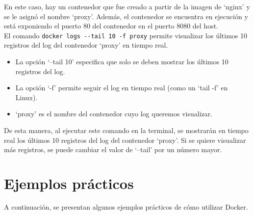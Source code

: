 \documentclass{article}
\begin{document}
En este caso, hay un contenedor que fue creado a partir de la imagen de \enquote*{nginx} y se le asignó el nombre \enquote*{proxy}. Además, el contenedor se encuentra en ejecución y está exponiendo el puerto 80 del contenedor en el puerto 8080 del host.\\
El comando \lstinline{docker logs --tail 10 -f proxy} permite visualizar los últimos 10 registros del log del contenedor \enquote*{proxy} en tiempo real.
\begin{itemize}
\item La opción \enquote*{--tail 10} especifica que solo se deben mostrar los últimos 10 registros del log.
\item La opción \enquote*{-f} permite seguir el log en tiempo real (como un \enquote*{tail -f} en Linux).
\item \enquote*{proxy} es el nombre del contenedor cuyo log queremos visualizar.
\end{itemize}
De esta manera, al ejecutar este comando en la terminal, se mostrarán en tiempo real los últimos 10 registros del log del contenedor \enquote*{proxy}. Si se quiere visualizar más registros, se puede cambiar el valor de \enquote*{--tail} por un número mayor.

\newpage
\section{Ejemplos prácticos}
A continuación, se presentan algunos ejemplos prácticos de cómo utilizar Docker.
\end{document}
